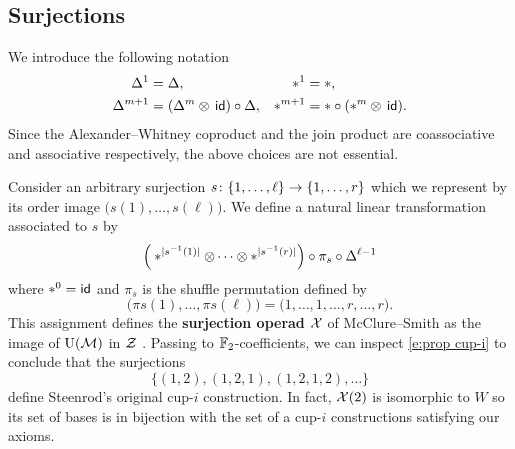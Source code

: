 
\subsection{Surjections}

We introduce the following notation
\begin{align*}
	\Delta^1 &= \Delta, &
	\ast^1 &= \ast, \\
	\Delta^{m+1} &= (\Delta^m \otimes \, \mathsf{id}) \circ \Delta, &
	\ast^{m+1} &= \ast \circ (\ast^m \otimes \, \mathsf{id}).
\end{align*}
Since the Alexander--Whitney coproduct and the join product are coassociative and associative respectively, the above choices are not essential.

Consider an arbitrary surjection $s \colon \{1,\dots,\ell\} \to \{1,\dots,r\}$ which we represent by its order image $\big(s(1),\dots,s(\ell)\big)$.
We define a natural linear transformation associated to $s$ by
\begin{equation}\label{e:surjection action}
	\Big( \ast^{\lvert s^{-1}(1)\rvert} \otimes \dotsb \otimes \ast^{\lvert s^{-1}(r)\rvert} \Big) \circ \pi_s \circ \Delta^{\ell-1}
\end{equation}
where $\ast^0 = \mathsf{id}$ and $\pi_s$ is the shuffle permutation defined by
\[
\big( \pi s(1), \dots, \pi s(\ell) \big) =
\big( 1, \dots, 1, \dots, r, \dots, r \big).
\]
This assignment defines the \textbf{surjection operad} $\mathcal{X}$ of McClure--Smith \cite{mcclure2003multivariable} as the image of $\operatorname{U}(\mathcal{M})$ in $\mathcal{Z}$ \cite[Appendix 1]{medina2020prop1}.
Passing to ${\mathbb{F}_2}$-coefficients, we can inspect \cref{e:prop cup-i} to conclude that the surjections
\[
\big\{ (1,2), (1,2,1), (1,2,1,2), \dots \big\}
\]
define Steenrod's original \mbox{cup-$i$} construction.
In fact, $\mathcal{X}(2)$ is isomorphic to $W$ so its set of bases is in bijection with the set of a \mbox{cup-$i$} constructions satisfying our axioms.

